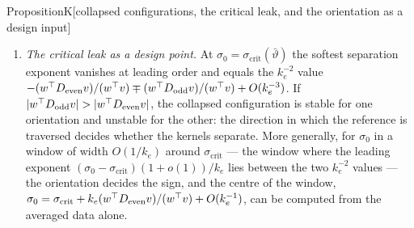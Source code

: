 \begin{thm}{Proposition}{K}[collapsed configurations, the critical leak, and the orientation as a design input]
\begin{enumerate}[label=\textup{(\roman*)}]
  \item \emph{The critical leak as a design point.} At $\sigma_0 = \sigma_{\mathrm{crit}}(\bar\vartheta)$ the softest
    separation exponent vanishes at leading order and equals the $k_e^{-2}$ value
    $-(w^\top D_{\mathrm{even}}v)/(w^\top v) \mp (w^\top D_{\mathrm{odd}}v)/(w^\top v) + O(k_e^{-3})$. If
    $\lvert w^\top D_{\mathrm{odd}}v\rvert > \lvert w^\top D_{\mathrm{even}}v\rvert$, the collapsed configuration is stable for one
    orientation and unstable for the other: the direction in which the reference is traversed decides whether the
    kernels separate. More generally, for $\sigma_0$ in a window of width $O(1/k_e)$ around $\sigma_{\mathrm{crit}}$
    --- the window where the leading exponent $(\sigma_0 - \sigma_{\mathrm{crit}})(1 + o(1))/k_e$ lies between the two
    $k_e^{-2}$ values --- the orientation decides the sign, and the centre of the window,
    $\sigma_0 = \sigma_{\mathrm{crit}} + k_e(w^\top D_{\mathrm{even}}v)/(w^\top v) + O(k_e^{-1})$, can be computed from
    the averaged data alone.
\end{enumerate}
\end{thm}

